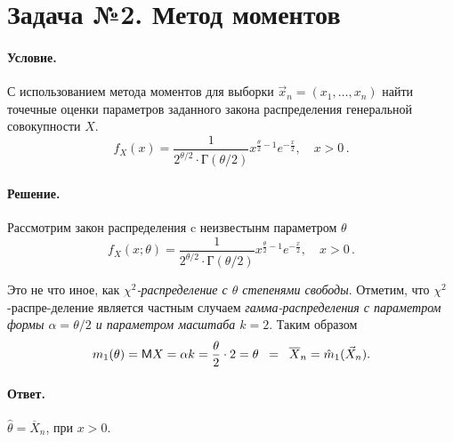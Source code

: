 
\section{Задача №2. Метод моментов}

\paragraph{Условие.} С использованием метода моментов для выборки $\vec{x}_n = (x_1, \dots, x_n)$ найти точечные оценки параметров заданного закона распределения генеральной совокупности $X$.
\[
    f_X (x) = \frac{1}{2^{\theta/2} \cdot \textsf{Г} (\theta/2)} x^{\frac{\theta}{2} - 1} e^{-\frac{x}{2}}, \quad x > 0\,.
\]

\paragraph{Решение.}
Рассмотрим закон распределения c неизвестынм параметром $\theta$
\[
    f_X (x; \theta) = \frac{1}{2^{\theta/2} \cdot \textsf{Г} (\theta/2)} x^{\frac{\theta}{2} - 1} e^{-\frac{x}{2}}, \quad x > 0\,.
\]

\noindent
Это не что иное, как \emph{$\chi^2$-распределение с $\theta$ степенями свободы}. Отметим, что $\chi^2$-распре-деление является частным случаем \emph{гамма-распределения с параметром формы $\alpha = \theta/2$ и параметром масштаба $k = 2$}. Таким образом
\[
    m_1(\theta) = \mathsf{M} X = \alpha k = \frac{\theta}{2} \cdot 2 = \theta \;\; = \;\; \overline{X}_n = \hat{m}_1(\vec{X}_n).
\]

\paragraph{Ответ.} $\hat\theta = \overline{X}_n$, при $x > 0$.